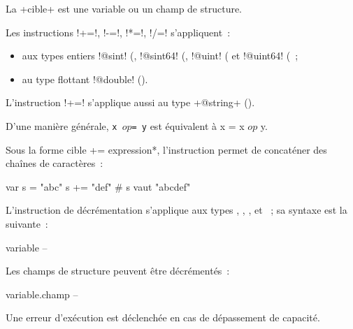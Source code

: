 La \ggs+cible+ est une variable ou un champ de structure.

Les instructions \ggs!+=!, \ggs!-=!, \ggs!*=!, \ggs!/=! s'appliquent~:
\begin{itemize}
 \item aux types entiers \ggs!@sint! (, \ggs!@sint64! (, \ggs!@uint! ( et \ggs!@uint64! (~;
 \item au type flottant \ggs!@double! ().
\end{itemize}

L'instruction \ggs!+=! s'applique aussi au type \ggs+@string+ ().

D'une manière générale, \texttt{x $op$= y} est équivalent à {x = x $op$ y}.



Sous la forme \ggs*cible += expression*, l'instruction permet de concaténer des chaînes de caractères~:
\begin{galgas}
var s = "abc"
s += "def" # s vaut "abcdef"
\end{galgas}
















L'instruction de décrémentation s'applique aux types , , ,  et ~; sa syntaxe est la suivante~:

\begin{galgasbox}
variable --
\end{galgasbox}

Les champs de structure peuvent être décrémentés~:
\begin{galgasbox}
variable.champ --
\end{galgasbox}

Une erreur d'exécution est déclenchée en cas de dépassement de capacité.

